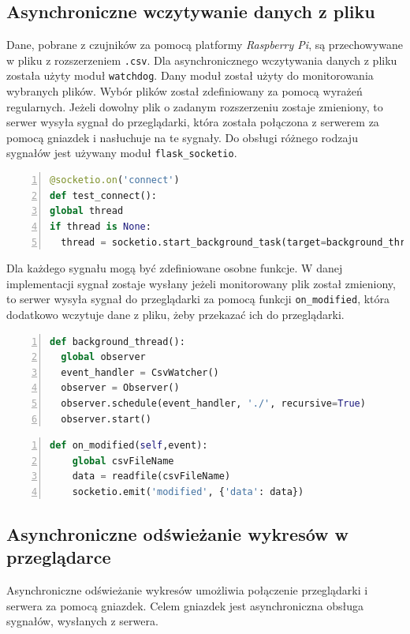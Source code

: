 \documentclass[a4paper]{article}
\begin{document}
\subsection{Asynchroniczne wczytywanie danych z pliku}
    Dane, pobrane z czujników za pomocą platformy \textit{Raspberry Pi}, są przechowywane w pliku z rozszerzeniem \texttt{.csv}.
    Dla asynchronicznego wczytywania danych z pliku została użyty moduł \texttt{watchdog}.
    Dany moduł został użyty do monitorowania wybranych plików. 
    Wybór plików został zdefiniowany za pomocą wyrażeń regularnych. 
    Jeżeli dowolny plik o zadanym rozszerzeniu zostaje zmieniony, to serwer wysyła sygnał do przeglądarki,
    która została połączona z serwerem za pomocą gniazdek i nasłuchuje na te sygnały.
    Do obsługi różnego rodzaju sygnałów jest używany moduł \texttt{flask\_socketio}.
    \begin{lstlisting}[frame=single, numbers=left, basicstyle=\ttfamily\small, language=python,
    caption={Połączenie gniazdka na serwerze z gniazdkiem w przeglądrce}]
@socketio.on('connect')
def test_connect():
global thread
if thread is None:
  thread = socketio.start_background_task(target=background_thread)
    \end{lstlisting}

    Dla każdego sygnału mogą być zdefiniowane osobne funkcje. 
    W danej implementacji sygnał zostaje wysłany 
    jeżeli monitorowany plik został zmieniony, to serwer wysyła sygnał
    do przeglądarki za pomocą funkcji \texttt{on\_modified}, która dodatkowo
    wczytuje dane z pliku, żeby przekazać ich do przeglądarki.
   \begin{lstlisting}[frame=single, numbers=left, basicstyle=\ttfamily\small, language=python,
    caption={Definicja wątku, monitorującego zmiany w plikach o zadanych rozszerzeniu}]
def background_thread():
  global observer
  event_handler = CsvWatcher()
  observer = Observer()
  observer.schedule(event_handler, './', recursive=True)
  observer.start()
   \end{lstlisting}

\begin{lstlisting}[frame=single, numbers=left, basicstyle=\ttfamily\small, language=python,
    caption={Definicja funkcji wysyłającej sygnał i dane}]
def on_modified(self,event):
    global csvFileName
    data = readfile(csvFileName)
    socketio.emit('modified', {'data': data})
   \end{lstlisting}

    \subsection{Asynchroniczne odświeżanie wykresów w przeglądarce}
    Asynchroniczne odświeżanie wykresów umożliwia połączenie przeglądarki i serwera za pomocą gniazdek.
    Celem gniazdek jest asynchroniczna obsługa sygnałów, wysłanych z serwera.
    
\end{document}

